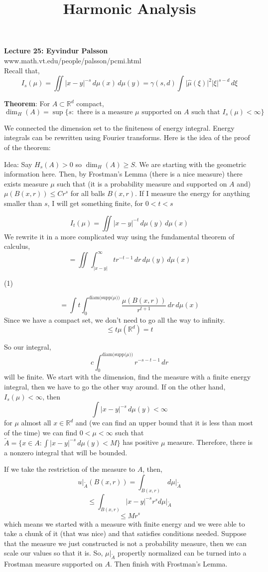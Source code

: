 \documentclass[12pt]{article}
\title{Harmonic Analysis}
\begin{document}
\noindent \textbf{Lecture 25: Eyvindur Palsson} \\
\noindent www.math.vt.edu/people/palsson/pcmi.html \\

\noindent Recall that,
$$I_s(\mu)= \iint \vert x-y \vert^{-s} \, d\mu(x) \, d\mu(y) = \gamma(s,d) \int \vert \hat{\mu}(\xi) \vert^2 \vert \xi \vert^{s-d} \,d\xi$$

\noindent \textbf{Theorem}: For $A \subset \mathbb{R}^d$ compact, 
$$\dim_H(A) = \sup \{ s : \text{ there is a measure } \mu \text{ supported on } A \text{ such that } I_s(\mu) < \infty\}$$

\noindent We connected the dimension set to the finiteness of energy integral. Energy integrals can be rewritten using Fourier transforms. Here is the idea of the proof of the theorem:

\noindent Idea: Say $H_s(A)>0$ so $\dim_H(A) \geq S$. We are starting with the geometric information here. Then, by Frostman's Lemma (there is a nice measure) there exists measure $\mu$ such that (it is a probability measure and supported on $A$ and) $\mu(B(x,r))\leq C r^s$ for all balls $B(x,r)$. If I measure the energy for anything smaller than $s$, I will get something finite, for $0 < t < s$  

$$I_t(\mu) = \iint\vert x -y \vert^{-t} \, d\mu(y) \, d\mu(x)$$
We rewrite it in a more complicated way using the fundamental theorem of calculus,
$$= \iint \int_{\vert x-y \vert}^\infty tr^{-t-1} \, dr \,d \mu(y) \, d\mu(x)$$

(1) 

$$= \int t \int^{\text{diam(supp(}\mu))}_0 \frac{\mu(B(x,r))}{r^{t+1}} \,dr \,d\mu(x)$$
Since we have a compact set, we don't need to go all the way to infinity. 
$$ \leq t\mu(\mathbb{R}^d) = t$$

So our integral, 
$$c\int^{\text{diam(supp(}\mu))}_0 r^{-s-t-1} \, dr$$
will be finite. We start with the dimension, find the measure with a finite energy integral, then we have to go the other way around.
If on the other hand, $I_s(\mu)<\infty$, then
$$ \int \vert x-y \vert^{-s} \, d\mu(y) < \infty$$
for $\mu$ almost all $x \in \mathbb{R}^d$ and (we can find an upper bound that it is less than most of the time) we can find $0 < \mu < \infty$ such that $\tilde{A} = \{x \in A : \int \vert x-y \vert^{-s} \, d\mu(y) < M \}$ has positive $\mu$ measure. Therefore, there is a nonzero integral that will be bounded. 

If we take the restriction of the measure to $A$, then,
$$u\vert_{\tilde{A}} (B(x,r)) = \int_{B(x,r)} \, d\mu \vert_{\tilde{A}}$$
$$\leq \int_{B(x,r)} \vert x-y \vert^{-s} r^s d\mu\vert_{\tilde{A}}$$
$$ \leq M r^s$$
which means we started with a measure with finite energy and we were able to take a chunk of it (that was nice) and that satisfies conditions needed. Suppose that the measure we just constructed is not a probability measure, then we can scale our values so that it is. So,
$\mu\vert_{\tilde{A}}$ propertly normalized can be turned into a Frostman measure supported on $A$. Then finish with Frostman's Lemma.
\end{document}
